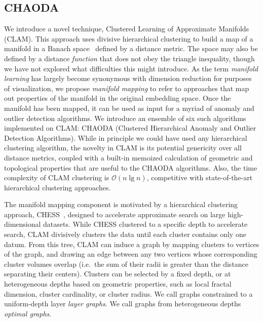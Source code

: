 
\subsection{CHAODA}
\label{subsec:introduction:chaoda}

We introduce a novel technique, Clustered Learning of Approximate Manifolds (CLAM).
This approach uses divisive hierarchical clustering to build a map of a manifold in a Banach space~\cite{banach1929fonctionnelles} defined by a distance metric.
The space may also be defined by a distance \textit{function} that does not obey the triangle inequality, though we have not explored what difficulties this might introduce.
As the term \emph{manifold learning} has largely become synonymous with dimension reduction for purposes of visualization, we propose \emph{manifold mapping} to refer to approaches that map out properties of the manifold in the original embedding space.
Once the manifold has been mapped, it can be used as input for a myriad of anomaly and outlier detection algorithms.
We introduce an ensemble of six such algorithms implemented on CLAM: CHAODA (Clustered Hierarchical Anomaly and Outlier Detection Algorithms).
While in principle we could have used any hierarchical clustering algorithm, the novelty in CLAM is its potential genericity over all distance metrics, coupled with a built-in memoized calculation of geometric and topological properties that are useful to the CHAODA algorithms.
Also, the time complexity of CLAM clustering is $\mathcal{O}(n \lg n)$, competitive with state-of-the-art hierarchical clustering approaches.

The manifold mapping component is motivated by a hierarchical clustering approach, CHESS~\cite{ishaq2019clustered}, designed to accelerate approximate search on large high-dimensional datasets.
While CHESS clustered to a specific depth to accelerate search, CLAM
divisively clusters the data until each cluster contains only one datum.
From this tree, CLAM can induce a graph by mapping clusters to vertices of the graph, and drawing an edge between any two vertices whose corresponding cluster volumes overlap (i.e.\ the sum of their radii is greater than the distance separating their centers).
Clusters can be selected by a fixed depth, or at heterogeneous depths based on geometric properties, such as local fractal dimension, cluster cardinality, or cluster radius.
We call graphs constrained to a uniform-depth layer \textit{layer graphs}.
We call graphs from heterogeneous depths \textit{optimal graphs}.



